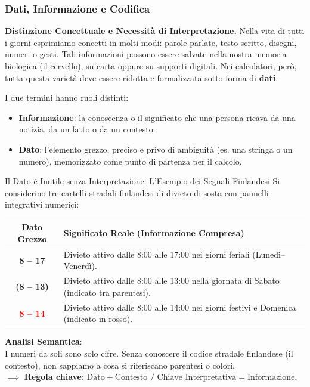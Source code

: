 \documentclass[12pt]{extarticle}
\begin{document}
\subsubsection{Dati, Informazione e Codifica}
\noindent \textbf{Distinzione Concettuale e Necessità di Interpretazione.} Nella vita di tutti i giorni esprimiamo concetti in molti modi: parole parlate, testo scritto, disegni, numeri o gesti. Tali informazioni possono essere salvate nella nostra memoria biologica (il cervello), su carta oppure su supporti digitali. Nei calcolatori, però, tutta questa varietà deve essere ridotta e formalizzata sotto forma di \textbf{dati}.

\medskip
\noindent I due termini hanno ruoli distinti:
\begin{itemize}
    \item \textbf{Informazione}: la conoscenza o il significato che una persona ricava da una notizia, da un fatto o da un contesto.
    \item \textbf{Dato}: l'elemento grezzo, preciso e privo di ambiguità (es. una stringa o un numero), memorizzato come punto di partenza per il calcolo.
\end{itemize}

\begin{cbox}{Il Dato è Inutile senza Interpretazione: L'Esempio dei Segnali Finlandesi}
\noindent Si considerino tre cartelli stradali finlandesi di divieto di sosta con pannelli integrativi numerici:
\begin{center}
\small
\begin{tabular}{cp{10.8cm}}
    \toprule
    \textbf{Dato Grezzo} & \textbf{Significato Reale (Informazione Compresa)} \\
    \midrule
    \textbf{8 -- 17} & Divieto attivo dalle 8:00 alle 17:00 nei giorni feriali (Lunedì--Venerdì). \\
    \addlinespace
    \textbf{(8 -- 13)} & Divieto attivo dalle 8:00 alle 13:00 nella giornata di Sabato (indicato tra parentesi). \\
    \addlinespace
    \textbf{\textcolor{red}{8 -- 14}} & Divieto attivo dalle 8:00 alle 14:00 nei giorni festivi e Domenica (indicato in rosso). \\
    \bottomrule
\end{tabular}
\end{center}
\medskip
\noindent \textbf{Analisi Semantica}: \\
I numeri da soli sono solo cifre. Senza conoscere il codice stradale finlandese (il contesto), non sappiamo a cosa si riferiscano parentesi o colori. \\
$\implies$ \textbf{Regola chiave}: $\text{Dato} + \text{Contesto / Chiave Interpretativa} = \text{Informazione}$.
\end{cbox}
\end{document}
